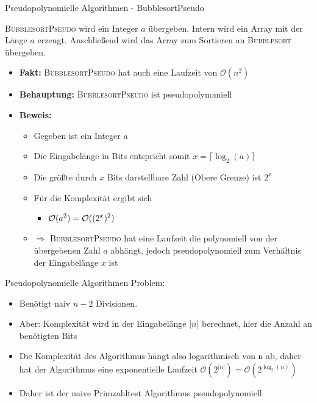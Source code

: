\begin{frame}{Pseudopolynomielle Algorithmen - BubblesortPseudo}
	
	\textsc{BubblesortPseudo} wird ein Integer $a$ übergeben. Intern wird ein Array mit der Länge $a$ erzeugt. Anschließend wird das Array zum Sortieren an \textsc{Bubblesort} übergeben.
	
	\begin{itemize}
		
		\item \textbf{Fakt:} \textsc{BubblesortPseudo} hat auch eine Laufzeit von $\mathcal{O}(n^2)$
		\item \textbf{Behauptung:} \textsc{BubblesortPseudo} ist pseudopolynomiell
		\pause
		\item \textbf{Beweis:} 
		\begin{itemize}
			\item Gegeben ist ein Integer $a$ 
			\item Die Eingabelänge in Bits entspricht somit $x = \lceil \log_2(a) \rceil$
			\item Die größte durch $x$ Bits darstellbare Zahl (Obere Grenze) ist $2^x$
			\item Für die Komplexität ergibt sich
			\begin{itemize}
				\item $\displaystyle \mathcal{O}(a^2) = \mathcal{O}((2^x)^2)$
			\end{itemize}
			\item[] $\Rightarrow$ \textsc{BubblesortPseudo} hat eine Laufzeit die polynomiell von der übergebenen Zahl $a$ abhängt, jedoch pseudopolynomiell zum Verhältnis der Eingabelänge $x$ ist
		\end{itemize}
	\end{itemize}
\end{frame}

\begin{frame}{Pseudopolynomielle Algorithmen}
Problem:

\begin{itemize}
	\item Benötigt naiv $n-2$ Divisionen.
	\item Aber: Komplexität wird in der Eingabelänge |$n$| berechnet, hier die Anzahl an benötigten Bits
	\item Die Komplexität des Algorithmus hängt also logarithmisch von n ab, daher hat der Algorithmus eine exponentielle Laufzeit $\mathcal{O}(2^{|n|}) = \mathcal{O}(2^{\log_2{(n)}})$
	\item Daher ist der naive Primzahltest Algorithmus pseudopolynomiell
\end{itemize}
\end{frame}

